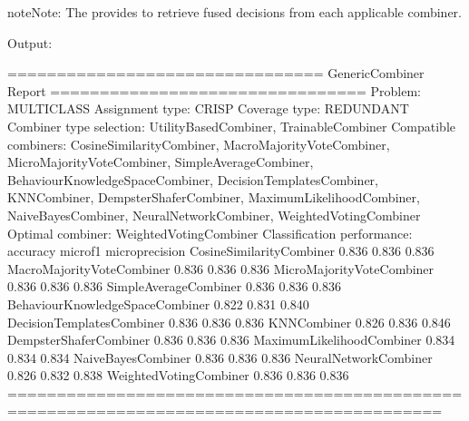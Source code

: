 \documentclass[letterpaper,10pt,english]{sphinxmanual}
\begin{document}
\begin{sphinxadmonition}{note}{Note:}
\sphinxAtStartPar
The  provides  to retrieve fused decisions from each
applicable combiner.
\end{sphinxadmonition}

\sphinxAtStartPar
Output:

\begin{sphinxVerbatim}[commandchars=\\\{\}]
================================ GenericCombiner \PYGZhy{} Report ================================
                   Problem: MULTI\PYGZus{}CLASS
           Assignment type: CRISP
             Coverage type: REDUNDANT
   Combiner type selection: UtilityBasedCombiner, TrainableCombiner
      Compatible combiners: CosineSimilarityCombiner, MacroMajorityVoteCombiner, MicroMajorityVoteCombiner, SimpleAverageCombiner, BehaviourKnowledgeSpaceCombiner, DecisionTemplatesCombiner, KNNCombiner, DempsterShaferCombiner, MaximumLikelihoodCombiner, NaiveBayesCombiner, NeuralNetworkCombiner, WeightedVotingCombiner
          Optimal combiner: WeightedVotingCombiner
Classification performance:
                                     accuracy  micro\PYGZus{}f1  micro\PYGZus{}precision
CosineSimilarityCombiner                0.836     0.836            0.836
MacroMajorityVoteCombiner               0.836     0.836            0.836
MicroMajorityVoteCombiner               0.836     0.836            0.836
SimpleAverageCombiner                   0.836     0.836            0.836
BehaviourKnowledgeSpaceCombiner         0.822     0.831            0.840
DecisionTemplatesCombiner               0.836     0.836            0.836
KNNCombiner                             0.826     0.836            0.846
DempsterShaferCombiner                  0.836     0.836            0.836
MaximumLikelihoodCombiner               0.834     0.834            0.834
NaiveBayesCombiner                      0.836     0.836            0.836
NeuralNetworkCombiner                   0.826     0.832            0.838
WeightedVotingCombiner                  0.836     0.836            0.836
==========================================================================================
\end{sphinxVerbatim}
\end{document}
